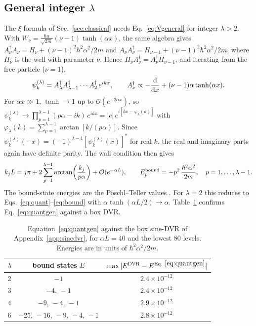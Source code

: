 \documentclass[11pt]{article}
\numberwithin{equation}{section}
\begin{document}
\subsection{General integer \texorpdfstring{$\lambda$}{lambda}}
\label{sec:generallambda}
The $\xi$ formula of Sec.~\ref{sec:classical} needs Eq.~\eqref{eq:Vgeneral} for integer $\lambda>2$. With $W_\nu=\frac{\hbar\alpha}{\sqrt{2m}}(\nu-1)\tanh(\alpha x)$, the same algebra gives $A_\nu^\dagger A_\nu=H_\nu+(\nu-1)^2\hbar^2\alpha^2/2m$ and $A_\nu A_\nu^\dagger=H_{\nu-1}+(\nu-1)^2\hbar^2\alpha^2/2m$, where $H_\nu$ is the well with parameter $\nu$. Hence $H_\nu A_\nu^\dagger=A_\nu^\dagger H_{\nu-1}$, and iterating from the free particle ($\nu=1$),
\begin{equation}
\psi_k^{(\lambda)}=A_\lambda^\dagger A_{\lambda-1}^\dagger\cdots A_2^\dagger\,e^{ikx},\qquad A_\nu^\dagger\propto-\dv{x}+(\nu-1)\alpha\tanh(\alpha x).
\end{equation}
For $\alpha x\gg1$, $\tanh\to1$ up to $\mathcal O(e^{-2\alpha x})$, so $\psi_k^{(\lambda)}\to\prod_{p=1}^{\lambda-1}(p\alpha-ik)\,e^{ikx}=|c|\,e^{i[kx-\varphi_\lambda(k)]}$ with $\varphi_\lambda(k)=\sum_{p=1}^{\lambda-1}\arctan[k/(p\alpha)]$. Since $\psi_k^{(\lambda)}(-x)=(-1)^{\lambda-1}[\psi_k^{(\lambda)}(x)]^*$ for real $k$, the real and imaginary parts again have definite parity. The wall condition then gives
\begin{equation}
k_jL=j\pi+2\sum_{p=1}^{\lambda-1}\arctan\!\left(\frac{k_j}{p\alpha}\right)+\mathcal O(e^{-\alpha L}),\qquad
E_p^{\rm bound}=-p^2\,\frac{\hbar^2\alpha^2}{2m},\quad p=1,\dots,\lambda-1.
\label{eq:quantgen}
\end{equation}
The bound-state energies are the P\"oschl--Teller values \cite{poschlteller1933,cooper1995}. For $\lambda=2$ this reduces to Eqs.~\eqref{eq:quant}--\eqref{eq:bound} with $\alpha\tanh(\alpha L/2)\to\alpha$. Table~\ref{tab:generallambda} confirms Eq.~\eqref{eq:quantgen} against a box DVR.

\begin{table}[h]
\centering
\caption{Equation~\eqref{eq:quantgen} against the box sine-DVR of Appendix~\ref{app:sinedvr}, for $\alpha L=40$ and the lowest 80 levels. Energies are in units of $\hbar^2\alpha^2/2m$.}
\label{tab:generallambda}
\begin{tabular}{ccc}
\toprule
$\lambda$ & bound states $E$ & $\max|E^{\rm DVR}-E^{\rm Eq.~\eqref{eq:quantgen}}|$\\
\midrule
2 & $-1$ & $2.4\times10^{-12}$\\
3 & $-4,\,-1$ & $2.4\times10^{-12}$\\
4 & $-9,\,-4,\,-1$ & $2.9\times10^{-12}$\\
6 & $-25,\,-16,\,-9,\,-4,\,-1$ & $2.8\times10^{-12}$\\
\bottomrule
\end{tabular}
\end{table}
\end{document}
